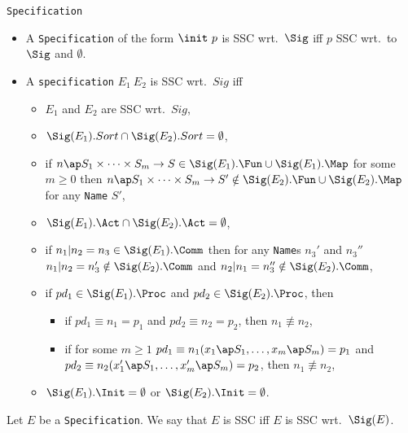 \documentclass[twoside,fleqn,a4paper,dvips]{article}
\begin{document}
\begin{Dn-arg}{{\tt Specification}}
\begin{itemize}
\begin{itemize}
\end{itemize}
\item
A {\tt Specification} of the form $\init~p$ is SSC wrt.\ $\Sig$ 
iff $p$ SSC wrt.\ to $\Sig$ and $\emptyset$.
\item
A {\tt specification} $E_1~E_2$ is SSC wrt.\ $Sig$ iff 
\begin{itemize}
\item
$E_1$ and $E_2$ are SSC wrt.\ $Sig$,
\item
$\Sig(E_1).Sort \cap \Sig(E_2).Sort=\emptyset$,
\item
if $n\ap S_1\times \cdots\times S_m\rightarrow S \in \Sig(E_1).\Fun\cup
\Sig(E_1).\Map$ for some
$m\geq 0$ then
$n\ap S_1\times\cdots\times S_m\rightarrow S'\notin \Sig(E_2).\Fun\cup
\Sig(E_2).\Map$ for any {\tt Name} $S'$,
\item
$\Sig(E_1).\Act \cap \Sig(E_2).\Act=\emptyset$,
\item
if $n_1| n_2=n_3\in \Sig(E_1).\Comm$ then for any {\tt Name}s $n_3'$
and $n_3''$ $n_1| n_2=n_3'\notin
\Sig(E_2).\Comm$ and $n_2| n_1=n_3''\notin \Sig(E_2).\Comm$, 
\item
if $pd_1\in \Sig(E_1).\Proc$ and $pd_2\in \Sig(E_2).\Proc$, then
\begin{itemize}
\item
if $pd_1\equiv n_1=p_1$ and $pd_2\equiv n_2=p_2$, then $n_1\not\equiv
n_2$,
\item
if for some $m\geq 1$ $pd_1\equiv n_1(x_1\ap S_1,\ldots,x_m\ap S_m)=p_1$
and 
$pd_2\equiv n_2(x_1'\ap S_1,\ldots,x_m'\ap S_m)=p_2$, then $n_1\not\equiv
n_2$,
\end{itemize}
\item
$\Sig(E_1).\Init=\emptyset$ or $\Sig(E_2).\Init=\emptyset$.
\end{itemize}
\end{itemize}
\end{Dn-arg}
\begin{Dn}
Let $E$ be a {\tt Specification}. We say that $E$ is SSC iff $E$ is SSC
wrt.\ $\Sig(E)$.
\end{Dn}
\end{document}
